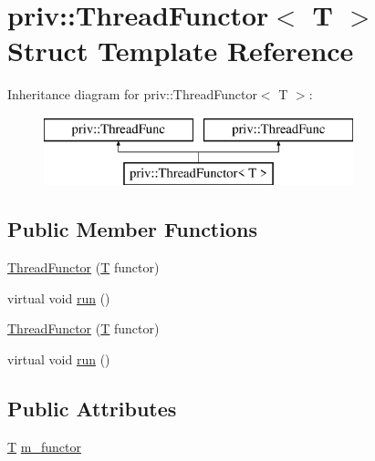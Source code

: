 \hypertarget{structpriv_1_1_thread_functor}{\section{priv\-:\-:Thread\-Functor$<$ T $>$ Struct Template Reference}
\label{structpriv_1_1_thread_functor}
}
Inheritance diagram for priv\-:\-:Thread\-Functor$<$ T $>$\-:\begin{figure}[H]
\begin{center}
\leavevmode
\includegraphics[height=2.000000cm]{structpriv_1_1_thread_functor}
\end{center}
\end{figure}
\subsection*{Public Member Functions}
\begin{DoxyCompactItemize}
\item 
\hyperlink{structpriv_1_1_thread_functor_a2df57df5cd6f7396b033512bb0e01848}{Thread\-Functor} (\hyperlink{curses_8priv_8h_a5ef253115820acf7d27f3c5c3b02a0f0}{T} functor)
\item 
virtual void \hyperlink{structpriv_1_1_thread_functor_a8bb44b4b46d08d844d070ae3fdb251d7}{run} ()
\item 
\hyperlink{structpriv_1_1_thread_functor_a2df57df5cd6f7396b033512bb0e01848}{Thread\-Functor} (\hyperlink{curses_8priv_8h_a5ef253115820acf7d27f3c5c3b02a0f0}{T} functor)
\item 
virtual void \hyperlink{structpriv_1_1_thread_functor_a8bb44b4b46d08d844d070ae3fdb251d7}{run} ()
\end{DoxyCompactItemize}
\subsection*{Public Attributes}
\begin{DoxyCompactItemize}
\item 
\hyperlink{curses_8priv_8h_a5ef253115820acf7d27f3c5c3b02a0f0}{T} \hyperlink{structpriv_1_1_thread_functor_a73254bbde4d3452de1aeda531ca632b2}{m\-\_\-functor}
\end{DoxyCompactItemize}


